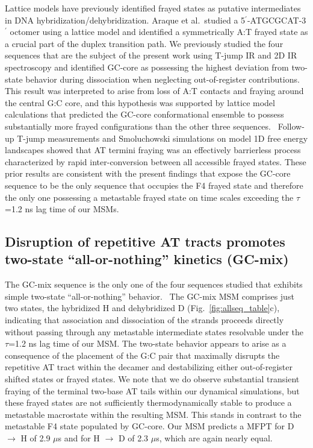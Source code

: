 \documentclass[journal=jpcbfk,manuscript=article]{achemso}
\begin{document}
Lattice models have previously identified frayed states as putative intermediates in DNA hybridization/dehybridization.\citep{Araque2016LatticeCooperativity, Phys2019,Sanstead2016} Araque et al.\ studied a 5$^\prime$-ATGCGCAT-3$^\prime$ octomer using a lattice model and identified a symmetrically A:T frayed state as a crucial part of the duplex transition path.\citep{Araque2016LatticeCooperativity} We previously studied the four sequences that are the subject of the present work using T-jump IR and 2D IR spectroscopy and identified GC-core as possessing the highest deviation from two-state behavior during dissociation when neglecting out-of-register contributions.\citep{Sanstead2016} This result was interpreted to arise from loss of A:T contacts and fraying around the central G:C core, and this hypothesis was supported by lattice model calculations that predicted the GC-core conformational ensemble to possess substantially more frayed configurations than the other three sequences.~\citep{Phys2019} Follow-up T-jump measurements and Smoluchowski simulations on model 1D free energy landscapes showed that AT termini fraying was an effectively barrierless process characterized by rapid inter-conversion between all accessible frayed states.\citep{Sanstead2018DirectDehybridization} These prior results are consistent with the present findings that expose the GC-core sequence to be the only sequence that occupies the F4 frayed state and therefore the only one possessing a metastable frayed state on time scales exceeding the $\tau$=1.2 ns lag time of our MSMs.





\subsection{Disruption of repetitive AT tracts promotes two-state ``all-or-nothing'' kinetics (GC-mix)}

The GC-mix sequence is the only one of the four sequences studied that exhibits simple two-state ``all-or-nothing'' behavior.~\citep{Xiao2019, Araque2016LatticeCooperativity, Sikora2013ModelingIntermediates, Sanstead2016} The GC-mix MSM comprises just two states, the hybridized H and dehybridized D (Fig.~\ref{fig:allseq_table}c), indicating that association and dissociation of the strands proceeds directly without passing through any metastable intermediate states resolvable under the $\tau$=1.2 ns lag time of our MSM. The two-state behavior appears to arise as a consequence of the placement of the G:C pair that maximally disrupts the repetitive AT tract within the decamer and destabilizing either out-of-register shifted states or frayed states. We note that we do observe substantial transient fraying of the terminal two-base AT tails within our dynamical simulations, but these frayed states are not sufficiently thermodynamically stable to produce a metastable macrostate within the resulting MSM. This stands in contrast to the metastable F4 state populated by GC-core. Our MSM predicts a MFPT for D $\rightarrow$ H of 2.9 $\mu$s and for H $\rightarrow$ D of 2.3 $\mu$s, which are again nearly equal.
\end{document}
